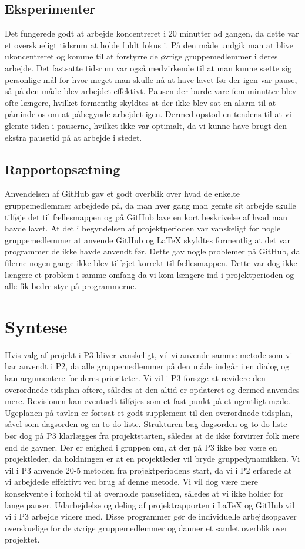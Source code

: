 \subsection{Eksperimenter}
Det fungerede godt at arbejde koncentreret i 20 minutter ad gangen, da dette var et overskueligt tidsrum at holde fuldt fokus i. På den måde undgik man at blive ukoncentreret og komme til at forstyrre de øvrige gruppemedlemmer i deres arbejde. Det fastsatte tidsrum var også medvirkende til at man kunne sætte sig personlige mål for hvor meget man skulle nå at have lavet før der igen var pause, så på den måde blev arbejdet effektivt. 
Pausen der burde vare fem minutter blev ofte længere, hvilket formentlig skyldtes at der ikke blev sat en alarm til at påminde os om at påbegynde arbejdet igen. Dermed opstod en tendens til at vi glemte tiden i pauserne, hvilket ikke var optimalt, da vi kunne have brugt den ekstra pausetid på at arbejde i stedet.

\subsection{Rapportopsætning}
Anvendelsen af GitHub gav et godt overblik over hvad de enkelte gruppemedlemmer arbejdede på, da man hver gang man gemte sit arbejde skulle tilføje det til fællesmappen og på GitHub lave en kort beskrivelse af hvad man havde lavet. 
At det i begyndelsen af projektperioden var vanskeligt for nogle gruppemedlemmer at anvende GitHub og LaTeX skyldtes formentlig at det var programmer de ikke havde anvendt før. Dette gav nogle problemer på GitHub, da filerne nogen gange ikke blev tilføjet korrekt til fællesmappen. Dette var dog ikke længere et problem i samme omfang da vi kom længere ind i projektperioden og alle fik bedre styr på programmerne. 

\section{Syntese}
Hvis valg af projekt i P3 bliver vanskeligt, vil vi anvende samme metode som vi har anvendt i P2, da alle gruppemedlemmer på den måde indgår i en dialog og kan argumentere for deres prioriteter. 
Vi vil i P3 forsøge at revidere den overordnede tidsplan oftere, således at den altid er opdateret og dermed anvendes mere. Revisionen kan eventuelt tilføjes som et fast punkt på et ugentligt møde. Ugeplanen på tavlen er fortsat et godt supplement til den overordnede tidsplan, såvel som dagsorden og en to-do liste. Strukturen bag dagsorden og to-do liste bør dog på P3 klarlægges fra projektstarten, således at de ikke forvirrer folk mere end de gavner.
Der er enighed i gruppen om, at der på P3 ikke bør være en projektleder, da holdningen er at en projektleder vil bryde gruppedynamikken.
Vi vil i P3 anvende 20-5 metoden fra projektperiodens start, da vi i P2 erfarede at vi arbejdede effektivt ved brug af denne metode. Vi vil dog være mere konsekvente i forhold til at overholde pausetiden, således at vi ikke holder for lange pauser. 
Udarbejdelse og deling af projektrapporten i LaTeX og GitHub vil vi i P3 arbejde videre med. Disse programmer gør de individuelle arbejdsopgaver overskuelige for de øvrige gruppemedlemmer og danner et samlet overblik over projektet.   

